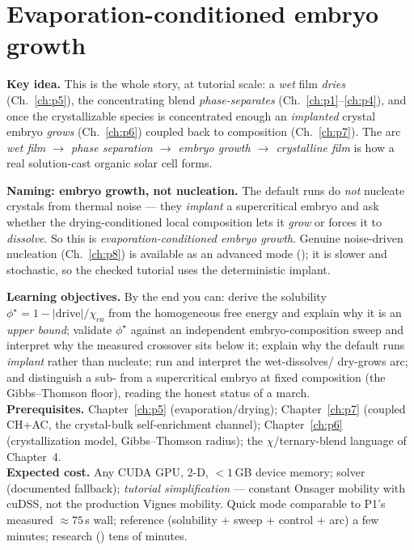 \chapter{Evaporation-conditioned embryo growth}
\label{ch:p9}

\begin{keybox}
\textbf{Key idea.} This is the whole story, at tutorial scale: a
\emph{wet} film \emph{dries} (Ch.~\ref{ch:p5}), the concentrating blend
\emph{phase-separates} (Ch.~\ref{ch:p1}--\ref{ch:p4}), and once the
crystallizable species is concentrated enough an \emph{implanted} crystal
embryo \emph{grows} (Ch.~\ref{ch:p6}) coupled back to composition
(Ch.~\ref{ch:p7}). The arc \emph{wet film $\to$ phase separation $\to$
embryo growth $\to$ crystalline film} is how a real solution-cast organic
solar cell forms.
\end{keybox}

\begin{keybox}
\textbf{Naming: embryo growth, not nucleation.} The default runs do
\emph{not} nucleate crystals from thermal noise --- they \emph{implant} a
supercritical embryo and ask whether the drying-conditioned local
composition lets it \emph{grow} or forces it to \emph{dissolve}. So this is
\emph{evaporation-conditioned embryo growth}. Genuine noise-driven
nucleation (Ch.~\ref{ch:p8}) is available as an advanced mode
(); it is slower and stochastic, so the
checked tutorial uses the deterministic implant.
\end{keybox}

\begin{keybox}
\textbf{Learning objectives.} By the end you can: derive the solubility
$\phi^\star=1-|\text{drive}|/\chi_{ca}$ from the homogeneous free energy
and explain why it is an \emph{upper bound}; validate $\phi^\star$
against an independent embryo-composition sweep and interpret why the
measured crossover sits below it; explain why the default runs
\emph{implant} rather than nucleate; run and interpret the wet-dissolves/
dry-grows arc; and distinguish a sub- from a supercritical embryo at
fixed composition (the Gibbs--Thomson floor), reading the honest
 status of a march.\\[2pt]
\textbf{Prerequisites.} Chapter~\ref{ch:p5} (evaporation/drying);
Chapter~\ref{ch:p7} (coupled CH+AC, the crystal-bulk self-enrichment
channel); Chapter~\ref{ch:p6} (crystallization model, Gibbs--Thomson
radius); the $\chi$/ternary-blend language of Chapter~4.\\[2pt]
\textbf{Expected cost.} Any CUDA GPU, 2-D, $<1$\,GB device memory; solver
 (documented  fallback); \emph{tutorial
simplification} --- constant Onsager mobility with cuDSS, not the
production Vignes mobility. Quick mode comparable to P1's measured
$\approx75$\,s wall; reference (solubility + sweep + control + arc) a
few minutes; research () tens of minutes.
\end{keybox}

